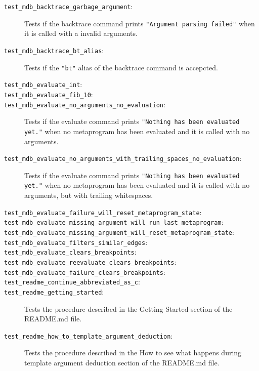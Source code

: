 \begin{description}
    \item[\texttt{test\_mdb\_backtrace\_garbage\_argument}:]
        Tests if the backtrace command prints
        \texttt{"Argument parsing failed"} when it is called with a invalid
        arguments.
    \item[\texttt{test\_mdb\_backtrace\_bt\_alias}:]
        Tests if the \texttt{"bt"} alias of the backtrace command is
        accepcted.
    \item[\texttt{test\_mdb\_evaluate\_int}:]
    \item[\texttt{test\_mdb\_evaluate\_fib\_10}:]
    \item[\texttt{test\_mdb\_evaluate\_no\_arguments\_no\_evaluation}:]
        Tests if the evaluate command prints
        \texttt{"Nothing has been evaluated yet."} when no metaprogram has been
        evaluated and it is called with no arguments.
    \item[\texttt{test\_mdb\_evaluate\_no\_arguments\_with\_trailing\_spaces\_no\_evaluation}:]
        Tests if the evaluate command prints
        \texttt{"Nothing has been evaluated yet."} when no metaprogram has been
        evaluated and it is called with no arguments, but with trailing
        whitespaces.
    \item[\texttt{test\_mdb\_evaluate\_failure\_will\_reset\_metaprogram\_state}:]
    \item[\texttt{test\_mdb\_evaluate\_missing\_argument\_will\_run\_last\_metaprogram}:]
    \item[\texttt{test\_mdb\_evaluate\_missing\_argument\_will\_reset\_metaprogram\_state}:]
    \item[\texttt{test\_mdb\_evaluate\_filters\_similar\_edges}:]
    \item[\texttt{test\_mdb\_evaluate\_clears\_breakpoints}:]
    \item[\texttt{test\_mdb\_evaluate\_reevaluate\_clears\_breakpoints}:]
    \item[\texttt{test\_mdb\_evaluate\_failure\_clears\_breakpoints}:]
    \item[\texttt{test\_readme\_continue\_abbreviated\_as\_c}:]
    \item[\texttt{test\_readme\_getting\_started}:]
        Tests the procedure described in the Getting Started section of the
        README.md file.
    \item[\texttt{test\_readme\_how\_to\_template\_argument\_deduction}:]
        Tests the procedure described in the How to see what happens during
        template argument deduction section of the README.md file.
\end{description}

